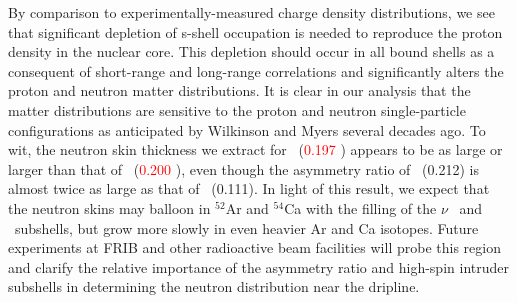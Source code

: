 By comparison to experimentally-measured charge density distributions, we see 
that significant depletion of s-shell occupation is needed to reproduce the
proton density in the nuclear core. This depletion should occur in all bound
shells as a consequent of short-range and long-range correlations and
significantly alters the proton and neutron matter distributions.
It is clear in our analysis that the matter distributions are sensitive
to the proton and neutron single-particle configurations as anticipated by
Wilkinson \cite{Wilkinson1967} and Myers \cite{Myers1969} several decades ago.
To wit, the neutron skin thickness we
extract for \oEight\ (\textcolor{red}{0.197} \femto\meter) appears
to be as large or larger than that of
\pbEight\ (\textcolor{red}{0.200} \femto\meter), even though the asymmetry ratio of \pbEight\
(0.212) is almost twice as large as that of \oEight\ (0.111). In light of this
result, we expect that the neutron skins may balloon in $^{52}$Ar and $^{54}$Ca
with the filling of the $\nu$ \fSeven\ and \fFive\ subshells, but grow more slowly
in even heavier Ar and Ca isotopes. Future experiments at FRIB and other
radioactive beam facilities will probe this region and clarify the relative
importance of the asymmetry ratio and high-spin intruder subshells in determining
the neutron distribution near the dripline.

